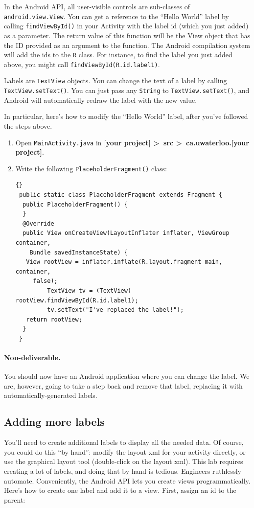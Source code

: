 \documentclass[10pt]{article}
\begin{document}
In the Android API, all user-visible controls are sub-classes of {\tt android.view.View}. You can get a reference to the ``Hello World'' label by calling {\tt findViewById()} in your Activity with the label id (which you just added) as a parameter. The return value of this function will be the View object that has the ID provided as an argument to the function. The Android compilation system will add the ids to the {\tt R} class. For instance, to find the label you just added above, you might call {\tt findViewById(R.id.label1)}. 

Labels are {\tt TextView} objects. You can change the text of a label by calling {\tt TextView.setText()}. You can just pass any {\tt String} to
{\tt TextView.setText()}, and Android will automatically redraw the label with the
new value.

In particular, here's how to modify the ``Hello World'' label, after you've followed
the steps above.

\begin{enumerate}
\item Open {\tt MainActivity.java} in  \textbf{[your project] \textgreater~src \textgreater~ca.uwaterloo.[your project]}. 
\item Write the following {\tt PlaceholderFragment()} class:


\begin{lstlisting}[]{}
 public static class PlaceholderFragment extends Fragment {
  public PlaceholderFragment() {
  }
  @Override
  public View onCreateView(LayoutInflater inflater, ViewGroup container,
    Bundle savedInstanceState) {
   View rootView = inflater.inflate(R.layout.fragment_main, container,
     false);
         TextView tv = (TextView) rootView.findViewById(R.id.label1);
         tv.setText("I've replaced the label!");
   return rootView;
  }
 }
\end{lstlisting}
\end{enumerate}

\paragraph{Non-deliverable.} You should now have an Android application where you can change the label. We are, however, going to take a step back and remove that label, replacing it with automatically-generated labels.

\subsection{Adding more labels}
You'll need to create additional labels to display all the needed data. Of course, you could do this ``by hand'': modify the layout xml for your activity directly, or use the graphical layout tool (double-click on the layout xml). This lab requires creating a lot of labels, and doing that by hand is tedious. Engineers ruthlessly automate. Conveniently, the Android API lets you create views programmatically. Here's how to create one label and add it to a view. First, assign an id to the parent:
\end{document}
